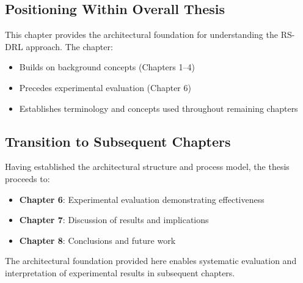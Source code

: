 \documentclass[11pt,a4paper]{article}
\begin{document}
\subsection{Positioning Within Overall Thesis}

This chapter provides the architectural foundation for understanding the RS-DRL approach. The chapter:

\begin{itemize}
    \item Builds on background concepts (Chapters 1--4)
    \item Precedes experimental evaluation (Chapter 6)
    \item Establishes terminology and concepts used throughout remaining chapters
\end{itemize}

\subsection{Transition to Subsequent Chapters}

Having established the architectural structure and process model, the thesis proceeds to:

\begin{itemize}
    \item \textbf{Chapter 6}: Experimental evaluation demonstrating effectiveness
    \item \textbf{Chapter 7}: Discussion of results and implications
    \item \textbf{Chapter 8}: Conclusions and future work
\end{itemize}

The architectural foundation provided here enables systematic evaluation and interpretation of experimental results in subsequent chapters.
\end{document}
